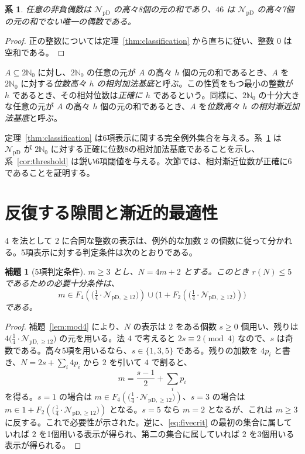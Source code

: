 \documentclass[12pt]{ltjsarticle}
\theoremstyle{plain}
\newtheorem{lemma}[theorem]{補題}
\newtheorem{corollary}[theorem]{系}
\theoremstyle{definition}
\theoremstyle{plain}
\newcommand{\NpD}{\mathcal{N}_{\mathrm{pD}}}
\newcommand{\Pset}{%
  \bigl(\tfrac{1}{4}\cdot\mathcal{N}_{\mathrm{pD},\geq 12}\bigr)%
}
\begin{document}
\begin{corollary}\label{cor:eight}
任意の非負偶数は $\NpD$ の高々8個の元の和であり、$46$ は $\NpD$ の高々7個の元の和でない唯一の偶数である。
\end{corollary}

\begin{proof}
正の整数については定理~\ref{thm:classification} から直ちに従い、整数 $0$ は空和である。
\end{proof}

$A\subseteq2\mathbb N_0$ に対し、$2\mathbb N_0$ の任意の元が $A$ の高々 $h$ 個の元の和であるとき、$A$ を $2\mathbb N_0$ に対する\emph{位数高々 $h$ の相対加法基底}と呼ぶ。この性質をもつ最小の整数が $h$ であるとき、その相対位数は\emph{正確に $h$} であるという。同様に、$2\mathbb N_0$ の十分大きな任意の元が $A$ の高々 $h$ 個の元の和であるとき、$A$ を\emph{位数高々 $h$ の相対漸近加法基底}と呼ぶ。

定理~\ref{thm:classification} は6項表示に関する完全例外集合を与える。系~\ref{cor:eight} は $\NpD$ が $2\mathbb N_0$ に対する正確に位数8の相対加法基底であることを示し、系~\ref{cor:threshold} は鋭い6項閾値を与える。次節では、相対漸近位数が正確に6であることを証明する。

\section{反復する隙間と漸近的最適性}\label{sec:asymptotic}

$4$ を法として $2$ に合同な整数の表示は、例外的な加数 $2$ の個数に従って分かれる。5項表示に対する判定条件は次のとおりである。

\begin{lemma}[5項判定条件]\label{lem:fivecrit}
$m\geq3$ とし、$N=4m+2$ とする。このとき $r(N)\leq5$ であるための必要十分条件は、
\begin{equation}\label{eq:fivecrit}
  m\in F_4(\Pset)\cup\bigl(1+F_2(\Pset)\bigr)
\end{equation}
である。
\end{lemma}

\begin{proof}
補題~\ref{lem:mod4} により、$N$ の表示は $2$ をある個数 $s\geq0$ 個用い、残りは $4\Pset$ の元を用いる。法 $4$ で考えると $2s\equiv2\pmod4$ なので、$s$ は奇数である。高々5項を用いるなら、$s\in\{1,3,5\}$ である。残りの加数を $4p_i$ と書き、$N=2s+\sum_i4p_i$ から $2$ を引いて $4$ で割ると、
\[
  m=\frac{s-1}{2}+\sum_i p_i
\]
を得る。$s=1$ の場合は $m\in F_4(\Pset)$、$s=3$ の場合は $m\in1+F_2(\Pset)$ となる。$s=5$ なら $m=2$ となるが、これは $m\geq3$ に反する。これで必要性が示された。逆に、\eqref{eq:fivecrit} の最初の集合に属していれば $2$ を1個用いる表示が得られ、第二の集合に属していれば $2$ を3個用いる表示が得られる。
\end{proof}
\end{document}
